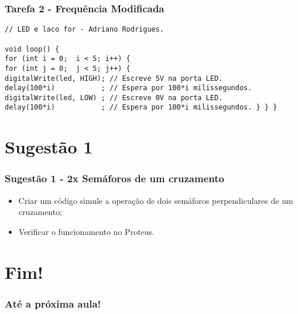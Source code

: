 \documentclass{beamer}
\begin{document}
\begin{frame}[fragile]
	\frametitle{Tarefa 2 - Frequência Modificada}
	\begin{lstlisting}[style=Arduino,basicstyle=\scriptsize \ttfamily]
// LED e laco for - Adriano Rodrigues.

void loop() {
for (int i = 0;  i < 5; i++) {
for (int j = 0;  j < 5; j++) {
digitalWrite(led, HIGH); // Escreve 5V na porta LED.
delay(100*i)           ; // Espera por 100*i milissegundos.
digitalWrite(led, LOW) ; // Escreve 0V na porta LED.
delay(100*i)           ; // Espera por 100*i milissegundos. } } } \end{lstlisting}
\end{frame}

\section{Sugestão 1}
\begin{frame}[fragile]
	\frametitle{Sugestão 1 - 2x Semáforos de um cruzamento}
	\begin{itemize}
	\item Criar um código simule a operação de dois semáforos perpendiculares de um cruzamento;
	\item Verificar o funcionamento no Proteus.
	\end{itemize}
\end{frame}

\section{Fim!}
\begin{frame}
	\frametitle{Até a próxima aula!}
	\titlepage
\end{frame}
\end{document}
